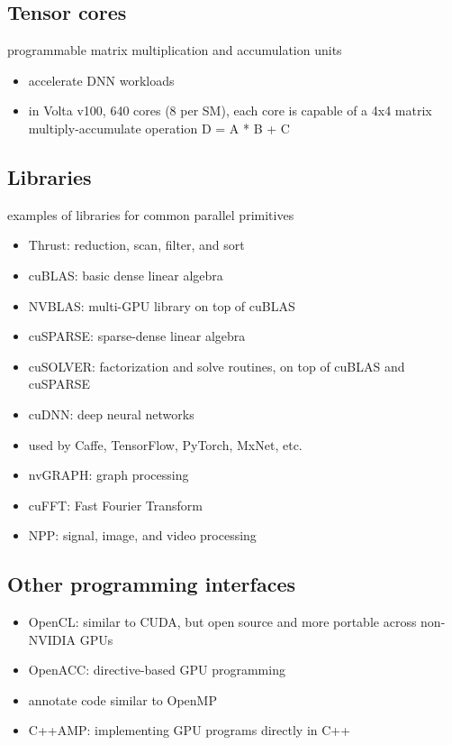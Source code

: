 \documentclass{article}
\begin{document}
\subsection{Tensor cores}

programmable matrix multiplication and accumulation units

\begin{itemize}
\item accelerate DNN workloads
\item in Volta v100, 640 cores (8 per SM), each core is capable of a 4x4 matrix multiply-accumulate operation D = A * B + C

\end{itemize}
\subsection{Libraries}

examples of libraries for common parallel primitives

\begin{itemize}
\item Thrust: reduction, scan, filter, and sort
\item cuBLAS: basic dense linear algebra
\item NVBLAS: multi-GPU library on top of cuBLAS
\item cuSPARSE: sparse-dense linear algebra
\item cuSOLVER: factorization and solve routines, on top of cuBLAS and cuSPARSE
\item cuDNN: deep neural networks
\item used by Caffe, TensorFlow, PyTorch, MxNet, etc.
\item nvGRAPH: graph processing
\item cuFFT: Fast Fourier Transform
\item NPP: signal, image, and video processing

\end{itemize}
\subsection{Other programming interfaces}

\begin{itemize}
\item OpenCL: similar to CUDA, but open source and more portable across non-NVIDIA GPUs
\item OpenACC: directive-based GPU programming
\item annotate code similar to OpenMP
\item C++AMP: implementing GPU programs directly in C++

\end{itemize}
\end{document}
